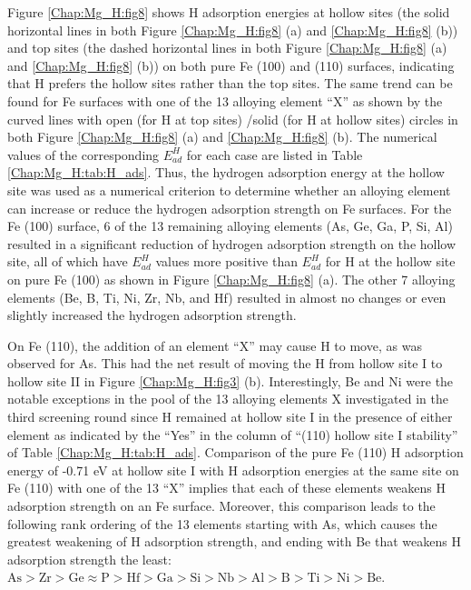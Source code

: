 Figure \ref{Chap:Mg_H:fig8} shows H adsorption energies at hollow sites (the solid horizontal lines in both Figure \ref{Chap:Mg_H:fig8} (a) and \ref{Chap:Mg_H:fig8} (b)) and top sites (the dashed horizontal lines in both Figure \ref{Chap:Mg_H:fig8} (a) and \ref{Chap:Mg_H:fig8} (b)) on both pure Fe (100) and (110) surfaces, indicating that H prefers the hollow sites rather than the top sites. The same trend can be found for Fe surfaces with one of the 13 alloying element ``X'' as shown by the curved lines with open (for H at top sites) /solid (for H at hollow sites) circles in both Figure \ref{Chap:Mg_H:fig8} (a) and \ref{Chap:Mg_H:fig8} (b). The numerical values of the corresponding $E_{ad}^H$ for each case are listed in Table \ref{Chap:Mg_H:tab:H_ads}. Thus, the hydrogen adsorption energy at the hollow site was used as a numerical criterion to determine whether an alloying element can increase or reduce the hydrogen adsorption strength on Fe surfaces. For the Fe (100) surface, 6 of the 13 remaining alloying elements (As, Ge, Ga, P, Si, Al) resulted in a significant reduction of hydrogen adsorption strength on the hollow site, all of which have $E_{ad}^H$ values more positive than $E_{ad}^H$ for H at the hollow site on pure Fe (100) as shown in Figure \ref{Chap:Mg_H:fig8} (a). The other 7 alloying elements (Be, B, Ti, Ni, Zr, Nb, and Hf) resulted in almost no changes or even slightly increased the hydrogen adsorption strength.


On Fe (110), the addition of an element ``X'' may cause H to move, as was observed for As. This had the net result of moving the H from hollow site I to hollow site II in Figure \ref{Chap:Mg_H:fig3} (b). Interestingly, Be and Ni were the notable exceptions in the pool of the 13 alloying elements X investigated in the third screening round since H remained at hollow site I in the presence of either element as indicated by the ``Yes'' in the column of ``(110) hollow site I stability'' of Table \ref{Chap:Mg_H:tab:H_ads}. Comparison of the pure Fe (110) H adsorption energy of -0.71 eV at hollow site I with H adsorption energies at the same site on Fe (110) with one of the 13 ``X'' implies that each of these elements weakens H adsorption strength on an Fe surface. Moreover, this comparison leads to the following rank ordering of the 13 elements starting with As, which causes the greatest weakening of H adsorption strength, and ending with Be that weakens H adsorption strength the least: $\text{As} > \text{Zr} > \text{Ge} \approx \text{P} > \text{Hf} > \text{Ga} > \text{Si} > \text{Nb} > \text{Al} > \text{B} > \text{Ti} > \text{Ni} > \text{Be}$.


